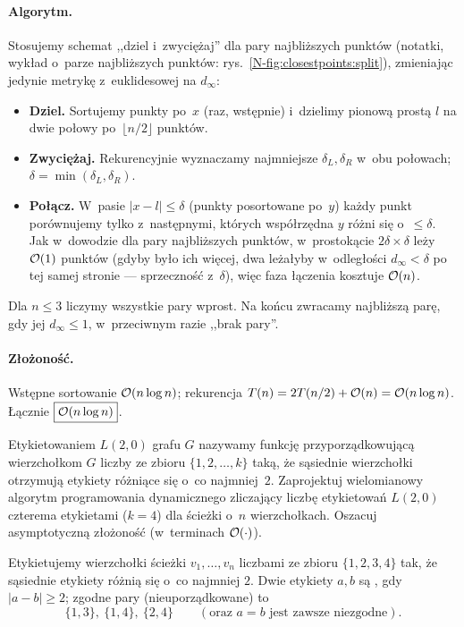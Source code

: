\paragraph{Algorytm.}
Stosujemy schemat ,,dziel i~zwyciężaj'' dla pary najbliższych punktów
(notatki, wykład o~parze najbliższych punktów: rys.~\ref{N-fig:closestpoints:split}),
zmieniając jedynie metrykę z~euklidesowej na $d_\infty$:
\begin{itemize}[nosep]
	\item \textbf{Dziel.} Sortujemy punkty po~$x$ (raz, wstępnie) i~dzielimy
	      pionową prostą $l$ na dwie połowy po~$\lfloor n/2\rfloor$ punktów.
	\item \textbf{Zwyciężaj.} Rekurencyjnie wyznaczamy najmniejsze
	      $\delta_L,\delta_R$ w~obu połowach; $\delta=\min(\delta_L,\delta_R)$.
	\item \textbf{Połącz.} W~pasie $|x-l|\leq\delta$ (punkty posortowane po~$y$)
	      każdy punkt porównujemy tylko z~następnymi, których współrzędna $y$
	      różni się o~$\leq\delta$. Jak w~dowodzie dla pary najbliższych punktów,
	      w~prostokącie $2\delta\times\delta$ leży $\mathcal{O}(1)$ punktów (gdyby było
	      ich więcej, dwa leżałyby w~odległości $d_\infty<\delta$ po tej samej
	      stronie --- sprzeczność z~$\delta$), więc faza łączenia kosztuje
	      $\mathcal{O}(n)$.
\end{itemize}
Dla $n\leq 3$ liczymy wszystkie pary wprost. Na końcu zwracamy najbliższą parę,
gdy jej $d_\infty\leq 1$, w~przeciwnym razie ,,brak pary''.

\paragraph{Złożoność.}
Wstępne sortowanie $\mathcal{O}(n\log n)$; rekurencja $T(n)=2T(n/2)+\mathcal{O}(n)=\mathcal{O}(n\log n)$.
Łącznie $\boxed{\mathcal{O}(n\log n)}$.

\clearpage
\begin{zadanie}
	Etykietowaniem $L(2,0)$ grafu $G$ nazywamy funkcję przyporządkowującą
	wierzchołkom $G$ liczby ze zbioru $\{1,2,\dots,k\}$ taką, że sąsiednie
	wierzchołki otrzymują etykiety różniące się o~co najmniej~$2$. Zaprojektuj
	wielomianowy algorytm programowania dynamicznego zliczający liczbę
	etykietowań $L(2,0)$ czterema etykietami ($k=4$) dla ścieżki o~$n$
	wierzchołkach. Oszacuj asymptotyczną złożoność (w~terminach $\mathcal{O}(\cdot)$).
\end{zadanie}

Etykietujemy wierzchołki ścieżki $v_1,\dots,v_n$ liczbami ze zbioru
$\{1,2,3,4\}$ tak, że sąsiednie etykiety różnią się o~co najmniej $2$.
Dwie etykiety $a,b$ są , gdy $|a-b|\geq 2$; zgodne pary
(nieuporządkowane) to
\[
	\{1,3\},\ \{1,4\},\ \{2,4\}\qquad(\text{oraz }a=b\text{ jest zawsze niezgodne}).
\]

